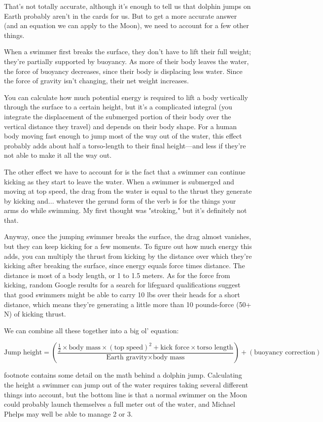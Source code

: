 {{{{That's not totally accurate, although it's enough to tell us that dolphin jumps on Earth probably aren't in the cards for us. But to get a more accurate answer (and an equation we can apply to the Moon), we need to account for a few other things.

When a swimmer first breaks the surface, they don't have to lift their full weight; they're partially supported by buoyancy. As more of their body leaves the water, the force of buoyancy decreases, since their body is displacing less water. Since the force of gravity isn't changing, their net weight increases.

You can calculate how much potential energy is required to lift a body vertically through the surface to a certain height, but it's a complicated integral (you integrate the displacement of the submerged portion of their body over the vertical distance they travel) and depends on their body shape. For a human body moving fast enough to jump most of the way out of the water, this effect probably adds about half a torso-length to their final height—and less if they're not able to make it all the way out.

The other effect we have to account for is the fact that a swimmer can continue kicking as they start to leave the water. When a swimmer is submerged and moving at top speed, the drag from the water is equal to the thrust they generate by kicking and... whatever the gerund form of the verb is for the things your arms do while swimming. My first thought was "stroking," but it's definitely not that.

Anyway, once the jumping swimmer breaks the surface, the drag almost vanishes, but they can keep kicking for a few moments. To figure out how much energy this adds, you can multiply the thrust from kicking by the distance over which they're kicking after breaking the surface, since energy equals force times distance. The distance is most of a body length, or 1 to 1.5 meters. As for the force from kicking, random Google results for a search for lifeguard qualifications suggest that good swimmers might be able to carry 10 lbs over their heads for a short distance, which means they're generating a little more than 10 pounds-force (50+ N) of kicking thrust.

We can combine all these together into a big ol' equation:

\[\text{Jump height}=\left(\frac{\tfrac{1}{2}\times\text{body mass}\times\left(\text{top speed}\right)^2+\text{kick force}\times\text{torso length}}{\text{Earth gravity}\times\text{body mass}}\right)+\left(\text{buoyancy correction}\right)\]} } footnote contains some detail on the math behind a dolphin jump. Calculating the height a swimmer can jump out of the water requires taking several different things into account, but the bottom line is that a normal swimmer on the Moon could probably launch themselves a full meter out of the water, and Michael Phelps may well be able to manage 2 or 3.}

}
